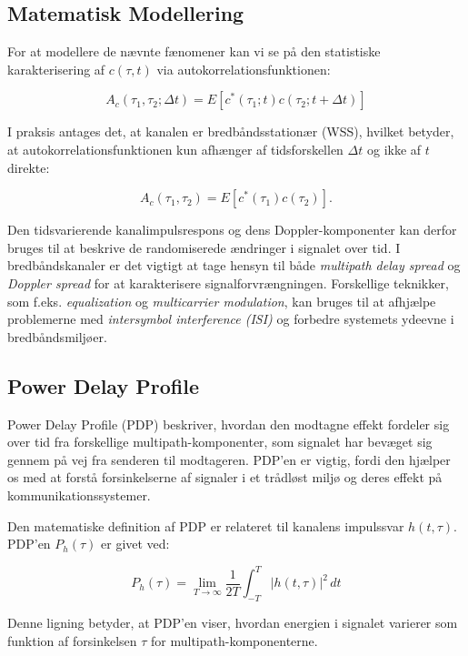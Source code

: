 \documentclass[a4paper,12pt]{book}
\begin{document}
	\subsection{Matematisk Modellering}
	For at modellere de nævnte fænomener kan vi se på den statistiske karakterisering af $c(\tau,t)$ via autokorrelationsfunktionen:
	
	\[
	A_c(\tau_1, \tau_2; \Delta t) = E[c^*(\tau_1; t)c(\tau_2; t+\Delta t)]
	\]
	
	I praksis antages det, at kanalen er bredbåndsstationær (WSS), hvilket betyder, at autokorrelationsfunktionen kun afhænger af tidsforskellen $\Delta t$ og ikke af $t$ direkte:
	
	\[
	A_c(\tau_1, \tau_2) = E[c^*(\tau_1)c(\tau_2)].
	\]
	
	Den tidsvarierende kanalimpulsrespons og dens Doppler-komponenter kan derfor bruges til at beskrive de randomiserede ændringer i signalet over tid.
	\newline\newline
	I bredbåndskanaler er det vigtigt at tage hensyn til både \textit{multipath delay spread} og \textit{Doppler spread} for at karakterisere signalforvrængningen. Forskellige teknikker, som f.eks. \textit{equalization} og \textit{multicarrier modulation}, kan bruges til at afhjælpe problemerne med \textit{intersymbol interference (ISI)} og forbedre systemets ydeevne i bredbåndsmiljøer.
	
	\subsection{Power Delay Profile}
	\label{sec:power_delay_profile}

	Power Delay Profile (PDP) beskriver, hvordan den modtagne effekt fordeler sig over tid fra forskellige multipath-komponenter, som signalet har bevæget sig gennem på vej fra senderen til modtageren. PDP'en er vigtig, fordi den hjælper os med at forstå forsinkelserne af signaler i et trådløst miljø og deres effekt på kommunikationssystemer.
	
	Den matematiske definition af PDP er relateret til kanalens impulssvar \( h(t, \tau) \). PDP'en \( P_h(\tau) \) er givet ved:
	
	\[
	P_h(\tau) = \lim_{T \to \infty} \frac{1}{2T} \int_{-T}^{T} |h(t, \tau)|^2 \, dt
	\]
	
	Denne ligning betyder, at PDP'en viser, hvordan energien i signalet varierer som funktion af forsinkelsen \( \tau \) for multipath-komponenterne.
	
\end{document}
